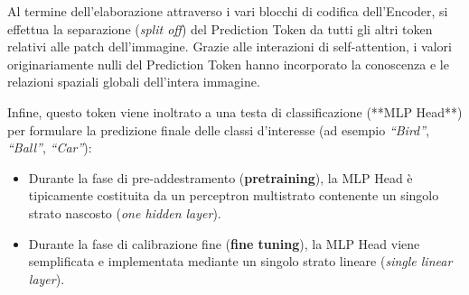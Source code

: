 ﻿\documentclass[11pt, a4paper]{article}
\begin{document}

Al termine dell'elaborazione attraverso i vari blocchi di codifica dell'Encoder, si effettua la separazione (\emph{split off}) del Prediction Token da tutti gli altri token relativi alle patch dell'immagine. Grazie alle interazioni di self-attention, i valori originariamente nulli del Prediction Token hanno incorporato la conoscenza e le relazioni spaziali globali dell'intera immagine.

Infine, questo token viene inoltrato a una testa di classificazione (**MLP Head**) per formulare la predizione finale delle classi d'interesse (ad esempio \emph{``Bird''}, \emph{``Ball''}, \emph{``Car''}):
\begin{itemize}
    \item Durante la fase di pre-addestramento (\textbf{pretraining}), la MLP Head è tipicamente costituita da un perceptron multistrato contenente un singolo strato nascosto (\emph{one hidden layer}).
    \item Durante la fase di calibrazione fine (\textbf{fine tuning}), la MLP Head viene semplificata e implementata mediante un singolo strato lineare (\emph{single linear layer}).
\end{itemize}
\end{document}
